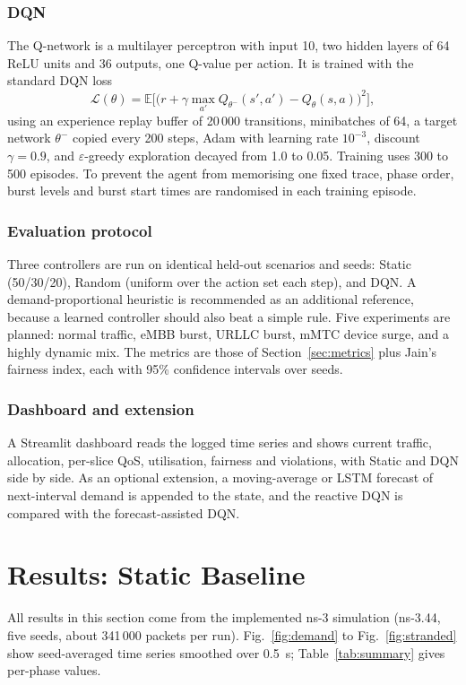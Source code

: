 \documentclass[conference]{IEEEtran}
\begin{document}
\subsubsection{DQN}
The Q-network is a multilayer perceptron with input 10, two hidden layers of 64 ReLU units and 36 outputs, one Q-value per action. It is trained with the standard DQN loss \cite{mnih2015}
\begin{equation}
\mathcal{L}(\theta)=\mathbb{E}\Big[\big(r+\gamma\max_{a'}Q_{\theta^-}(s',a')-Q_\theta(s,a)\big)^2\Big],
\end{equation}
using an experience replay buffer of 20\,000 transitions, minibatches of 64, a target network $\theta^-$ copied every 200 steps, Adam with learning rate $10^{-3}$, discount $\gamma=0.9$, and $\varepsilon$-greedy exploration decayed from 1.0 to 0.05. Training uses 300 to 500 episodes. To prevent the agent from memorising one fixed trace, phase order, burst levels and burst start times are randomised in each training episode.

\subsubsection{Evaluation protocol}
Three controllers are run on identical held-out scenarios and seeds: Static (50/30/20), Random (uniform over the action set each step), and DQN. A demand-proportional heuristic is recommended as an additional reference, because a learned controller should also beat a simple rule. Five experiments are planned: normal traffic, eMBB burst, URLLC burst, mMTC device surge, and a highly dynamic mix. The metrics are those of Section~\ref{sec:metrics} plus Jain's fairness index, each with 95\% confidence intervals over seeds.

\subsubsection{Dashboard and extension}
A Streamlit dashboard reads the logged time series and shows current traffic, allocation, per-slice QoS, utilisation, fairness and violations, with Static and DQN side by side. As an optional extension, a moving-average or LSTM forecast of next-interval demand is appended to the state, and the reactive DQN is compared with the forecast-assisted DQN.

\section{Results: Static Baseline}
All results in this section come from the implemented ns-3 simulation (ns-3.44, five seeds, about 341\,000 packets per run). Fig.~\ref{fig:demand} to Fig.~\ref{fig:stranded} show seed-averaged time series smoothed over 0.5~s; Table~\ref{tab:summary} gives per-phase values.
\end{document}
